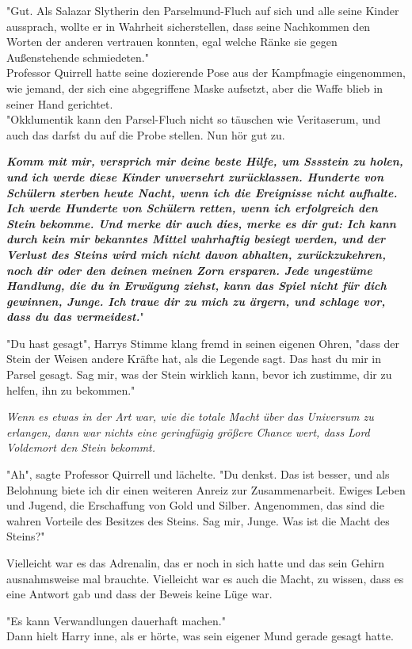 {"Gut. Als Salazar Slytherin den Parselmund-Fluch auf sich und alle seine Kinder aussprach, wollte er in Wahrheit sicherstellen, dass seine Nachkommen den Worten der anderen vertrauen konnten, egal welche Ränke sie gegen Außenstehende schmiedeten."\\ Professor Quirrell hatte seine dozierende Pose aus der Kampfmagie eingenommen, wie jemand, der sich eine abgegriffene Maske aufsetzt, aber die Waffe blieb in seiner Hand gerichtet.\\ "Okklumentik kann den Parsel-Fluch nicht so täuschen wie Veritaserum, und auch das darfst du auf die Probe stellen. Nun hör gut zu.

\textbf{\emph{Komm mit mir, versprich mir deine beste Hilfe, um Sssstein zu holen, und ich werde diese Kinder unversehrt zurücklassen. Hunderte von Schülern sterben heute Nacht, wenn ich die Ereignisse nicht aufhalte. Ich werde Hunderte von Schülern retten, wenn ich erfolgreich den Stein bekomme. Und merke dir auch dies, merke es dir gut: Ich kann durch kein mir bekanntes Mittel wahrhaftig besiegt werden, und der Verlust des Steins wird mich nicht davon abhalten, zurückzukehren, noch dir oder den deinen meinen Zorn ersparen. Jede ungestüme Handlung, die du in Erwägung ziehst, kann das Spiel nicht für dich gewinnen, Junge. Ich traue dir zu mich zu ärgern, und schlage vor, dass du das vermeidest.}}"

"Du hast gesagt", Harrys Stimme klang fremd in seinen eigenen Ohren, "dass der Stein der Weisen andere Kräfte hat, als die Legende sagt. Das hast du mir in Parsel gesagt. Sag mir, was der Stein wirklich kann, bevor ich zustimme, dir zu helfen, ihn zu bekommen."

\emph{Wenn es etwas in der Art war, wie die totale Macht über das Universum zu erlangen, dann war nichts eine geringfügig größere Chance wert, dass Lord Voldemort den Stein bekommt.}

"Ah", sagte Professor Quirrell und lächelte. "Du denkst. Das ist besser, und als Belohnung biete ich dir einen weiteren Anreiz zur Zusammenarbeit. Ewiges Leben und Jugend, die Erschaffung von Gold und Silber. Angenommen, das sind die wahren Vorteile des Besitzes des Steins. Sag mir, Junge. Was ist die Macht des Steins?"

Vielleicht war es das Adrenalin, das er noch in sich hatte und das sein Gehirn ausnahmsweise mal brauchte. Vielleicht war es auch die Macht, zu wissen, dass es eine Antwort gab und dass der Beweis keine Lüge war.

"Es kann Verwandlungen dauerhaft machen."\\ Dann hielt Harry inne, als er hörte, was sein eigener Mund gerade gesagt hatte.

}
